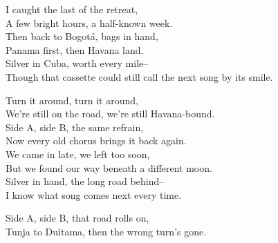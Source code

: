 \begin{lyrics}
I caught the last of the retreat,\\
A few bright hours, a half-known week.\\
Then back to Bogotá, bags in hand,\\
Panama first, then Havana land.\\
Silver in Cuba, worth every mile--\\
Though that cassette could still call the next song by its smile.

Turn it around, turn it around,\\
We're still on the road, we're still Havana-bound.\\
Side A, side B, the same refrain,\\
Now every old chorus brings it back again.\\
We came in late, we left too soon,\\
But we found our way beneath a different moon.\\
Silver in hand, the long road behind--\\
I know what song comes next every time.

Side A, side B, that road rolls on,\\
Tunja to Duitama, then the wrong turn's gone.
\end{lyrics}

